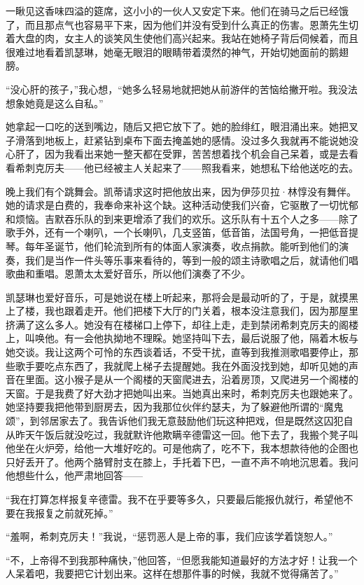 \par 一瞅见这香味四溢的筵席，这小小的一伙人又安定下来。他们在骑马之后已经饿了，而且那点气也容易平下来，因为他们并没有受到什么真正的伤害。恩萧先生切着大盘的肉，女主人的谈笑风生使他们高兴起来。我站在她椅子背后伺候着，而且很难过地看着凯瑟琳，她毫无眼泪的眼睛带着漠然的神气，开始切她面前的鹅翅膀。
\par “没心肝的孩子，”我心想，“她多么轻易地就把她从前游伴的苦恼给撇开啦。我没法想象她竟是这么自私。”
\par 她拿起一口吃的送到嘴边，随后又把它放下了。她的脸绯红，眼泪涌出来。她把叉子滑落到地板上，赶紧钻到桌布下面去掩盖她的感情。没过多久我就再不能说她没心肝了，因为我看出来她一整天都在受罪，苦苦想着找个机会自己呆着，或是去看看希刺克厉夫——他已经被主人关起来了——照我看来，她想私下给他送吃的去。
\par 晚上我们有个跳舞会。凯蒂请求这时把他放出来，因为伊莎贝拉·林惇没有舞伴。她的请求是白费的，我奉命来补这个缺。这种活动使我们兴奋，它驱散了一切忧郁和烦恼。吉默吞乐队的到来更增添了我们的欢乐。这乐队有十五个人之多——除了歌手外，还有一个喇叭，一个长喇叭，几支竖笛，低音笛，法国号角，一把低音提琴。每年圣诞节，他们轮流到所有的体面人家演奏，收点捐款。能听到他们的演奏，我们是当作一件头等乐事来看待的，等到一般的颂主诗歌唱之后，就请他们唱歌曲和重唱。恩萧太太爱好音乐，所以他们演奏了不少。
\par 凯瑟琳也爱好音乐，可是她说在楼上听起来，那将会是最动听的了，于是，就摸黑上了楼，我也跟着走开。他们把楼下大厅的门关着，根本没注意我们，因为那屋里挤满了这么多人。她没有在楼梯口上停下，却往上走，走到禁闭希刺克厉夫的阁楼上，叫唤他。有一会他执拗地不理睬。她坚持叫下去，最后说服了他，隔着木板与她交谈。我让这两个可怜的东西谈着话，不受干扰，直等到我推测歌唱要停止，那些歌手要吃点东西了，我就爬上梯子去提醒她。我在外面没找到她，却听见她的声音在里面。这小猴子是从一个阁楼的天窗爬进去，沿着房顶，又爬进另一个阁楼的天窗。于是我费了好大劲才把她叫出来。当她真出来时，希刺克厉夫也跟她来了。她坚持要我把他带到厨房去，因为我那位伙伴约瑟夫，为了躲避他所谓的“魔鬼颂”，到邻居家去了。我告诉他们我无意鼓励他们玩这种把戏，但是既然这囚犯自从昨天午饭后就没吃过，我就默许他欺瞒辛德雷这一回。他下去了，我搬个凳子叫他坐在火炉旁，给他一大堆好吃的。可是他病了，吃不下，我本想款待他的企图也只好丢开了。他两个胳臂肘支在膝上，手托着下巴，一直不声不响地沉思着。我问他想些什么，他严肃地回答——
\par “我在打算怎样报复辛德雷。我不在乎要等多久，只要最后能报仇就行，希望他不要在我报复之前就死掉。”
\par “羞啊，希刺克厉夫！”我说，“惩罚恶人是上帝的事，我们应该学着饶恕人。”
\par “不，上帝得不到我那种痛快，”他回答，“但愿我能知道最好的方法才好！让我一个人呆着吧，我要把它计划出来。这样在想那件事的时候，我就不觉得痛苦了。”
